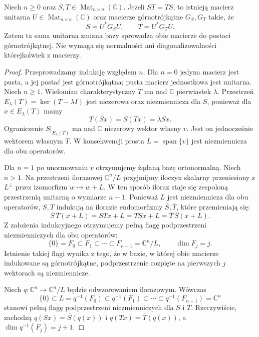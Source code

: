 \begin{twierdzenie}
\label{thm:lin14-simultaneous-schur}
Niech \(n\geq 0\) oraz \(S,T\in\operatorname{Mat}_{n\times n}(\mathbb C)\).
Jeżeli \(ST=TS\), to istnieją macierz unitarna
\(U\in\operatorname{Mat}_{n\times n}(\mathbb C)\)
oraz macierze górnotrójkątne \(G_S,G_T\) takie, że
\[
 S=U^*G_SU,\qquad T=U^*G_TU.
\]
Zatem ta sama unitarna zmiana bazy
sprowadza obie macierze do postaci górnotrójkątnej.
Nie wymaga się normalności ani diagonalizowalności
którejkolwiek z macierzy.
\end{twierdzenie}
\begin{proof}
Przeprowadzamy indukcję względem \(n\).
Dla \(n=0\) jedyna macierz jest pusta,
a jej postać jest górnotrójkątna;
pusta macierz jednostkowa jest unitarna.
Niech \(n\geq1\).
Wielomian charakterystyczny \(T\)
ma nad \(\mathbb C\) pierwiastek \(\lambda\).
Przestrzeń \(E_\lambda(T)=\ker(T-\lambda I)\)
jest niezerowa oraz niezmiennicza dla \(S\),
ponieważ dla \(x\in E_\lambda(T)\) mamy
\[
 T(Sx)=S(Tx)=\lambda Sx.
\]
Ograniczenie \(S|_{E_\lambda(T)}\)
ma nad \(\mathbb C\) niezerowy wektor własny \(v\).
Jest on jednocześnie wektorem własnym \(T\).
W konsekwencji prosta
\(L=\operatorname{span}\{v\}\) jest niezmiennicza
dla obu operatorów.

Dla \(n=1\) po unormowaniu \(v\) otrzymujemy
żądaną bazę ortonormalną. Niech \(n>1\).
Na przestrzeni ilorazowej \(\mathbb C^n/L\)
przyjmijmy iloczyn skalarny przeniesiony
z \(L^\perp\) przez izomorfizm
\(w\mapsto w+L\). W ten sposób iloraz
staje się zespoloną przestrzenią unitarną
o wymiarze \(n-1\).
Ponieważ \(L\) jest niezmiennicza
dla obu operatorów, \(S,T\)
indukują na ilorazie endomorfizmy
\(\overline S,\overline T\), które przemieniają się:
\[
 \overline S\,\overline T(x+L)
 =STx+L=TSx+L
 =\overline T\,\overline S(x+L).
\]
Z założenia indukcyjnego otrzymujemy
pełną flagę podprzestrzeni niezmienniczych
dla obu operatorów:
\[
 \{0\}=F_0\subset F_1\subset\cdots
 \subset F_{n-1}=\mathbb C^n/L,
 \qquad\dim F_j=j.
\]
Istnienie takiej flagi wynika z tego,
że w bazie, w której obie macierze indukowane
są górnotrójkątne, podprzestrzenie
rozpięte na pierwszych \(j\) wektorach
są niezmiennicze.

Niech \(q\colon\mathbb C^n\to\mathbb C^n/L\)
będzie odwzorowaniem ilorazowym.
Wówczas
\[
 \{0\}\subset L=q^{-1}(F_0)
 \subset q^{-1}(F_1)\subset\cdots
 \subset q^{-1}(F_{n-1})=\mathbb C^n
\]
stanowi pełną flagę podprzestrzeni
niezmienniczych dla \(S\) i \(T\).
Rzeczywiście, zachodzą
\(q(Sx)=\overline S(q(x))\) i
\(q(Tx)=\overline T(q(x))\),
a \(\dim q^{-1}(F_j)=j+1\).


\end{proof}
